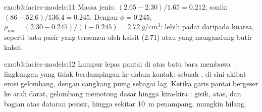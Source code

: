 \begin{solution}{exo:b3:facies-models:11}
Massa jenis: $(2.65 - 2.30)/1.65 = 0.212$; sonik: $(86 - 52.6)/136.4 = 0.245$.
Dengan $\phi = 0.245$, $\rho_{\mathrm{ma}} = (2.30 - 0.245)/(1 - 0.245) =
\qty{2.72}{g/cm^3}$: lebih padat daripada kuarsa, seperti batu pasir yang tersemen oleh
kalsit (2.71) atau yang mengandung butir kalsit.
\end{solution}

\begin{solution}{exo:b3:facies-models:12}
Lumpur lepas pantai di atas batu bara membawa lingkungan yang tidak berdampingan ke dalam kontak: sebuah
, di sini  akibat erosi gelombang, dengan cangkang
puing sebagai lag. Ketika garis pantai bergeser ke arah darat, gelombang memotong dasar
hingga kira-kira : gisik,  atas, dan
bagian atas dataran pesisir, hingga sekitar \qty{10}{m} penampang, mungkin
hilang.
\end{solution}

